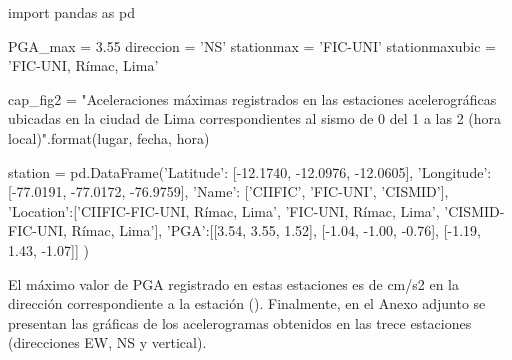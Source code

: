 \documentclass[11pt, a4paper]{report}
\begin{document}
\begin{pycode}
import pandas as pd

PGA_max = 3.55
direccion = 'NS'
stationmax = 'FIC-UNI'
stationmaxubic = 'FIC-UNI, Rímac, Lima'

cap_fig2 = "Aceleraciones máximas registrados en las estaciones acelerográficas ubicadas en la ciudad de Lima correspondientes al sismo de {0} del {1} a las {2} (hora local)".format(lugar, fecha, hora)

station = pd.DataFrame({'Latitude': [-12.1740, -12.0976, -12.0605], 
                        'Longitude': [-77.0191, -77.0172, -76.9759], 
                        'Name': ['CIIFIC', 'FIC-UNI', 'CISMID'], 
                        'Location':['CIIFIC-FIC-UNI, Rímac, Lima', 'FIC-UNI, Rímac, Lima', 'CISMID-FIC-UNI, Rímac, Lima'],
                        'PGA':[[3.54, 3.55, 1.52], [-1.04, -1.00, -0.76], [-1.19, 1.43, -1.07]]
                        })

\end{pycode}

\newpage
\noindent
El máximo valor de PGA registrado en estas estaciones es de  cm/s2 en la dirección  
correspondiente a la estación  ().
Finalmente, en el Anexo adjunto se presentan las gráficas de los acelerogramas obtenidos 
en las trece estaciones (direcciones EW, NS y vertical).
\end{document}
